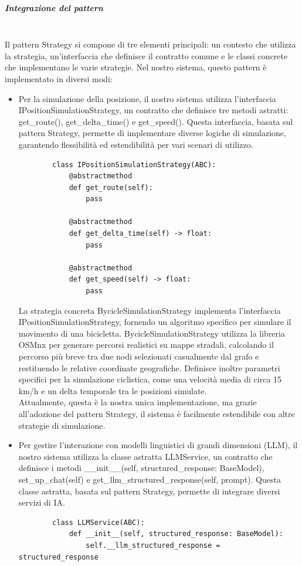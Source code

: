 \documentclass[10pt]{article}
\newcommand{\mysubparagraph}[1]{\subparagraph{#1}\mbox{}\\}
\begin{document}
    \mysubparagraph{Integrazione del pattern}
    Il pattern Strategy si compone di tre elementi principali: un contesto che utilizza la strategia, un'interfaccia che definisce il contratto comune e le classi concrete che implementano le varie strategie. Nel nostro sistema, questo pattern è implementato in diversi modi:
    \begin{itemize}
        \item Per la simulazione della posizione, il nostro sistema utilizza l'interfaccia IPositionSimulationStrategy, un contratto che definisce tre metodi astratti: get\_route(), get\_delta\_time() e get\_speed(). Questa interfaccia, basata sul pattern Strategy, permette di implementare diverse logiche di simulazione, garantendo flessibilità ed estendibilità per vari scenari di utilizzo.
        \begin{lstlisting}
        class IPositionSimulationStrategy(ABC):
            @abstractmethod
            def get_route(self):
                pass

            @abstractmethod
            def get_delta_time(self) -> float:
                pass

            @abstractmethod
            def get_speed(self) -> float:
                pass
        \end{lstlisting}
        La strategia concreta BycicleSimulationStrategy implementa l'interfaccia IPositionSimulationStrategy, fornendo un algoritmo specifico per simulare il movimento di una bicicletta.
        BycicleSimulationStrategy utilizza la libreria OSMnx per generare percorsi realistici su mappe stradali, calcolando il percorso più breve tra due nodi selezionati casualmente dal grafo e restituendo le relative coordinate geografiche. Definisce inoltre parametri specifici per la simulazione ciclistica, come una velocità media di circa 15 km/h e un delta temporale tra le posizioni simulate.\\
        Attualmente, questa è la nostra unica implementazione, ma grazie all'adozione del pattern Strategy, il sistema è facilmente estendibile con altre strategie di simulazione.

        \item Per gestire l'interazione con modelli linguistici di grandi dimensioni (LLM), il nostro sistema utilizza la classe astratta LLMService, un contratto che definisce i metodi \_\_init\_\_(self, structured\_response: BaseModel), set\_up\_chat(self) e get\_llm\_structured\_response(self, prompt). Questa classe astratta, basata sul pattern Strategy, permette di integrare diversi servizi di IA.
        \begin{lstlisting}
        class LLMService(ABC):
            def __init__(self, structured_response: BaseModel):
                self.__llm_structured_response = structured_response


\end{lstlisting}
\end{itemize}
\end{document}
